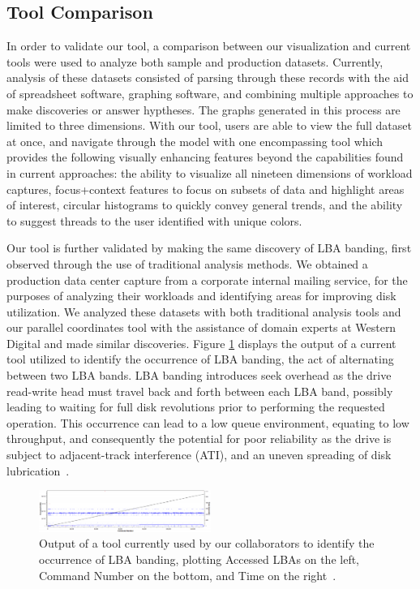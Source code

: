 \documentclass[journal]{vgtc}                %
\begin{document}
\subsection{Tool Comparison}
In order to validate our tool, a comparison between our visualization and current tools were used to analyze both sample and production datasets. Currently, analysis of these datasets consisted of parsing through these records with the aid of spreadsheet software, graphing software, and combining multiple approaches to make discoveries or answer hyptheses. The graphs generated in this process are limited to three dimensions. With our tool, users are able to view the full dataset at once, and navigate through the model with one encompassing tool which provides the following visually enhancing features beyond the capabilities found in current approaches: the ability to visualize all nineteen dimensions of workload captures, focus+context features to focus on subsets of data and highlight areas of interest, circular histograms to quickly convey general trends, and the ability to suggest threads to the user identified with unique colors.

Our tool is further validated by making the same discovery of LBA banding, first observed through the use of traditional analysis methods. We obtained a production data center capture from a corporate internal mailing service, for the purposes of analyzing their workloads and identifying areas for improving disk utilization. We analyzed these datasets with both traditional analysis tools and our parallel coordinates tool with the assistance of domain experts at Western Digital and made similar discoveries. Figure \ref{fig:prev_tool} displays the output of a current tool utilized to identify the occurrence of LBA banding, the act of alternating between two LBA bands. LBA banding introduces seek overhead as the drive read-write head must travel back and forth between each LBA band, possibly leading to waiting for full disk revolutions prior to performing the requested operation. This occurrence can lead to a low queue environment, equating to low throughput, and consequently the potential for poor reliability as the drive is subject to adjacent-track interference (ATI), and an uneven spreading of disk lubrication~\cite{internal:collab}. 

\begin{figure}[h!]
 \centering
 \includegraphics[width=0.5\textwidth]{images/prev_tool.eps}
 \caption[Output of a tool currently used to identify LBA banding.]{Output of a tool currently used by our collaborators to identify the occurrence of LBA banding, plotting Accessed LBAs on the left, Command Number on the bottom, and Time on the right~\cite{internal:collab}.}
 \label{fig:prev_tool}
\end{figure}
\end{document}
